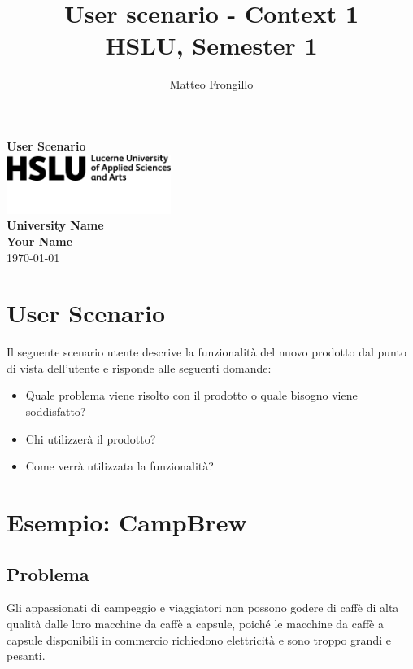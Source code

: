 \documentclass{article}
\title{\textbf{User scenario - Context 1\\ HSLU, Semester 1}}
\author{Matteo Frongillo}
\begin{document}
\begin{titlepage}
    \centering
    \vspace*{1cm}
    
    {\Huge \textbf{User Scenario}}\\[1.5cm]
    
    \includegraphics[width=0.4\textwidth]{media/hslu-svg-logo.png}\\[2cm] %
    
    \vspace{1.5cm}
    \large
    \textbf{University Name}\\[1cm]
    \textbf{Your Name}\\
    \vfill
    \today
    
\end{titlepage}

\section*{User Scenario}
Il seguente scenario utente descrive la funzionalità del nuovo prodotto dal punto di vista dell'utente e risponde alle seguenti domande:

\begin{itemize}
    \item Quale problema viene risolto con il prodotto o quale bisogno viene soddisfatto?
    \item Chi utilizzerà il prodotto?
    \item Come verrà utilizzata la funzionalità?
\end{itemize}

\section*{Esempio: CampBrew}

\subsection*{Problema}
Gli appassionati di campeggio e viaggiatori non possono godere di caffè di alta qualità dalle loro macchine da caffè a capsule, poiché le macchine da caffè a capsule disponibili in commercio richiedono elettricità e sono troppo grandi e pesanti.
\end{document}
